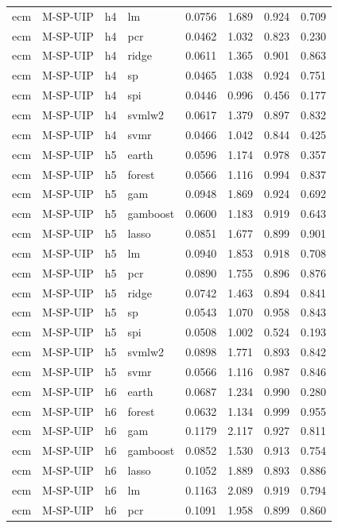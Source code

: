 \begin{ThreePartTable}
\begin{longtable}[t]{llclcccc}
ecm & M-SP-UIP & h4 & lm & 0.0756 & 1.689 & 0.924 & 0.709\\
ecm & M-SP-UIP & h4 & pcr & 0.0462 & 1.032 & 0.823 & 0.230\\
ecm & M-SP-UIP & h4 & ridge & 0.0611 & 1.365 & 0.901 & 0.863\\
ecm & M-SP-UIP & h4 & sp & 0.0465 & 1.038 & 0.924 & 0.751\\
ecm & M-SP-UIP & h4 & spi & 0.0446 & 0.996 & 0.456 & 0.177\\
ecm & M-SP-UIP & h4 & svmlw2 & 0.0617 & 1.379 & 0.897 & 0.832\\
ecm & M-SP-UIP & h4 & svmr & 0.0466 & 1.042 & 0.844 & 0.425\\
\addlinespace
ecm & M-SP-UIP & h5 & earth & 0.0596 & 1.174 & 0.978 & 0.357\\
ecm & M-SP-UIP & h5 & forest & 0.0566 & 1.116 & 0.994 & 0.837\\
ecm & M-SP-UIP & h5 & gam & 0.0948 & 1.869 & 0.924 & 0.692\\
ecm & M-SP-UIP & h5 & gamboost & 0.0600 & 1.183 & 0.919 & 0.643\\
ecm & M-SP-UIP & h5 & lasso & 0.0851 & 1.677 & 0.899 & 0.901\\
ecm & M-SP-UIP & h5 & lm & 0.0940 & 1.853 & 0.918 & 0.708\\
ecm & M-SP-UIP & h5 & pcr & 0.0890 & 1.755 & 0.896 & 0.876\\
ecm & M-SP-UIP & h5 & ridge & 0.0742 & 1.463 & 0.894 & 0.841\\
ecm & M-SP-UIP & h5 & sp & 0.0543 & 1.070 & 0.958 & 0.843\\
ecm & M-SP-UIP & h5 & spi & 0.0508 & 1.002 & 0.524 & 0.193\\
ecm & M-SP-UIP & h5 & svmlw2 & 0.0898 & 1.771 & 0.893 & 0.842\\
ecm & M-SP-UIP & h5 & svmr & 0.0566 & 1.116 & 0.987 & 0.846\\
\addlinespace
ecm & M-SP-UIP & h6 & earth & 0.0687 & 1.234 & 0.990 & 0.280\\
ecm & M-SP-UIP & h6 & forest & 0.0632 & 1.134 & 0.999 & 0.955\\
ecm & M-SP-UIP & h6 & gam & 0.1179 & 2.117 & 0.927 & 0.811\\
ecm & M-SP-UIP & h6 & gamboost & 0.0852 & 1.530 & 0.913 & 0.754\\
ecm & M-SP-UIP & h6 & lasso & 0.1052 & 1.889 & 0.893 & 0.886\\
ecm & M-SP-UIP & h6 & lm & 0.1163 & 2.089 & 0.919 & 0.794\\
ecm & M-SP-UIP & h6 & pcr & 0.1091 & 1.958 & 0.899 & 0.860\\

\end{longtable}
\end{ThreePartTable}

